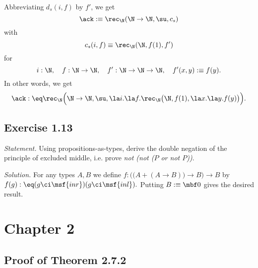 \documentclass[12pt]{article}
\begin{document}
Abbreviating $d_s(i,f)$ by $f'$, we get 
$$
\ack:\equiv\rec_\N(\N\to\N,\su,c_s)
$$ 
with 
$$ 
c_s(i,f)\equiv\rec_\N(\N,f(1),f')
$$ 
for 
$$ 
i:\N,\quad f:\N\to\N,\quad f':\N\to\N\to\N,\quad f'(x,y):\equiv f(y).
$$ 
In other words, we get 
$$
\ack:\eq\rec_\N\Big(\N\to\N,\su,\la i.\la f.\rec_\N\big(\N,f(1),\la x.\la y.f(y)\big)\Big).
$$


\subsection{Exercise 1.13}

\emph{Statement.} Using propositions-as-types, derive the double negation of the principle of excluded middle, i.e. prove \emph{not (not ($P$ or not $P$))}.

\nn\emph{Solution.} For any types $A,B$ we define $f:\Big(\big(A+(A\to B)\big)\to B\Big)\to B$ by $f(g):\eq(g\ci\msf{inr})(g\ci\msf{inl}).$ Putting $B:\equiv\mbf0$ gives the desired result.

\begin{comment}

Here is a slightly stronger statement: For any types $A,B,C$ the types

(a) $\big((A+B)\to C\big)\to\big((A\to C)\times(B\to C)\big)$,

(b) $\big((A\to C)\times(B\to C)\big)\to\big((A+B)\to C\big)$,

(c) $(A\to B)\to A\to B$,

(d) $\Big(\big(A+(A\to B)\big)\to B\Big)\to\Big((A\to B)\times\big((A\to B)\to B\big)\Big)$, 

(e) $\Big((A\to B)\times\big((A\to B)\to B\big)\Big)\to B$,

(f) $\Big(\big(A+(A\to B)\big)\to B\Big)\to B$

\nn are inhabited. The proof that (a), (b), (c) are inhabited is left to the reader. The fact that (a) and (c) are inhabited implies that (d) and (e), and thus (f), are inhabited. Putting $B:\equiv\mbf0$ in (f) gives the desired result.

\end{comment}


\section{Chapter 2}

\subsection{Proof of Theorem 2.7.2}
\end{document}

